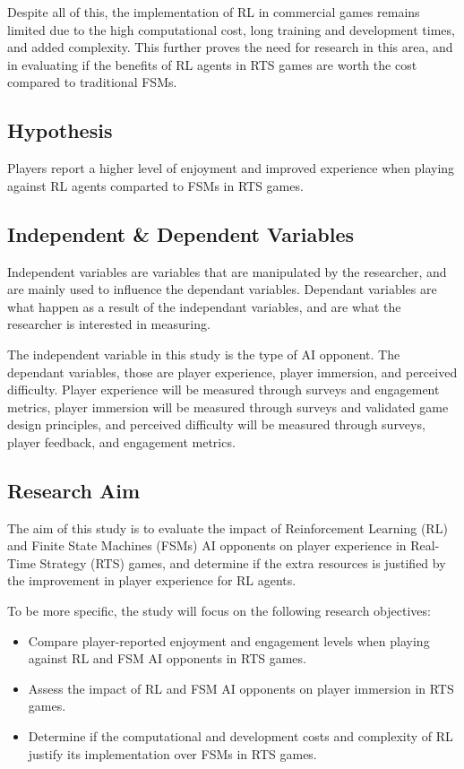 \documentclass[conference]{IEEEtran}
\begin{document}
Despite all of this, the implementation of RL in commercial games remains limited due to the high computational cost, long training and development times, and added complexity.
This further proves the need for research in this area, and in evaluating if the benefits of RL agents in RTS games are worth the cost compared to traditional FSMs.

\subsection{Hypothesis}

Players report a higher level of enjoyment and improved experience when playing against RL agents comparted to FSMs in RTS games.

\subsection{Independent \& Dependent Variables}

Independent variables are variables that are manipulated by the researcher, and are mainly used to influence the dependant variables. Dependant variables are what happen as a result of the independant variables,
and are what the researcher is interested in measuring.

The independent variable in this study is the type of AI opponent. The dependant variables, those are player experience, player immersion, and perceived difficulty.
Player experience will be measured through surveys and engagement metrics, player immersion will be measured through surveys and validated game design principles, and perceived difficulty will be measured through
surveys, player feedback, and engagement metrics.

\subsection{Research Aim}

The aim of this study is to evaluate the impact of Reinforcement Learning (RL) and Finite State Machines (FSMs) AI opponents on player experience in Real-Time Strategy (RTS) games, and determine if the extra resources
is justified by the improvement in player experience for RL agents.

To be more specific, the study will focus on the following research objectives:

\begin{itemize}
	\item Compare player-reported enjoyment and engagement levels when playing against RL and FSM AI opponents in RTS games.
	\item Assess the impact of RL and FSM AI opponents on player immersion in RTS games.
	\item Determine if the computational and development costs and complexity of RL justify its implementation over FSMs in RTS games.
\end{itemize}
\end{document}
